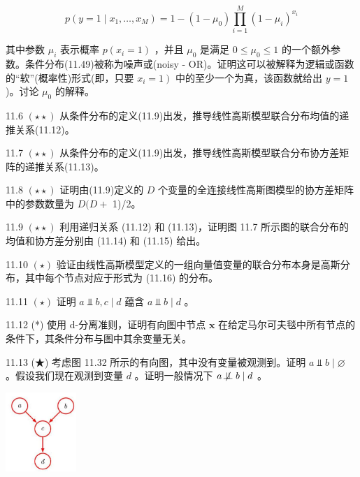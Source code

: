 \documentclass[10pt]{article}
\begin{document}
\[
p\left( {y = 1 \mid  {x}_{1},\ldots ,{x}_{M}}\right)  = 1 - \left( {1 - {\mu }_{0}}\right) \mathop{\prod }\limits_{{i = 1}}^{M}{\left( 1 - {\mu }_{i}\right) }^{{x}_{i}} \tag{11.49}
\]

其中参数 \({\mu }_{i}\) 表示概率 \(p\left( {{x}_{i} = 1}\right)\) ，并且 \({\mu }_{0}\) 是满足 \(0 \leq  {\mu }_{0} \leq  1\) 的一个额外参数。条件分布(11.49)被称为噪声或(noisy - OR)。证明这可以被解释为逻辑或函数的“软”(概率性)形式(即，只要 \(\left. {{x}_{i} = 1}\right)\) 中的至少一个为真，该函数就给出 \(y = 1\) )。讨论 \({\mu }_{0}\) 的解释。

11.6 \(\left( {\star  \star  }\right)\) 从条件分布的定义(11.9)出发，推导线性高斯模型联合分布均值的递推关系(11.12)。

11.7 \(\left( {\star  \star  }\right)\) 从条件分布的定义(11.9)出发，推导线性高斯模型联合分布协方差矩阵的递推关系(11.13)。

11.8 \(\left( {\star  \star  }\right)\) 证明由(11.9)定义的 \(D\) 个变量的全连接线性高斯图模型的协方差矩阵中的参数数量为 \(D(D +\) 1)/2。

11.9 \(\left( {\star  \star  }\right)\) 利用递归关系 (11.12) 和 (11.13)，证明图 11.7 所示图的联合分布的均值和协方差分别由 (11.14) 和 (11.15) 给出。

11.10 \(\left( \star \right)\) 验证由线性高斯模型定义的一组向量值变量的联合分布本身是高斯分布，其中每个节点对应于形式为 (11.16) 的分布。

11.11 \(\left( \star \right)\) 证明 \(a ⫫ b,c \mid  d\) 蕴含 \(a ⫫ b \mid  d\) 。

11.12 (*) 使用 d-分离准则，证明有向图中节点 \(\mathbf{x}\) 在给定马尔可夫毯中所有节点的条件下，其条件分布与图中其余变量无关。

11.13 (★) 考虑图 11.32 所示的有向图，其中没有变量被观测到。证明 \(a ⫫ b \mid  \varnothing\) 。假设我们现在观测到变量 \(d\) 。证明一般情况下 \(a \mathrel{ \not \! \perp \!\!\! \perp } b \mid  d\) 。

\begin{center}
\includegraphics[max width=0.2\textwidth]{images/0194e279-9b28-703a-88f4-c3ac21e2010d_374_1272_337_281_316_0.jpg}
\end{center}
\hspace*{3em} 
\end{document}
